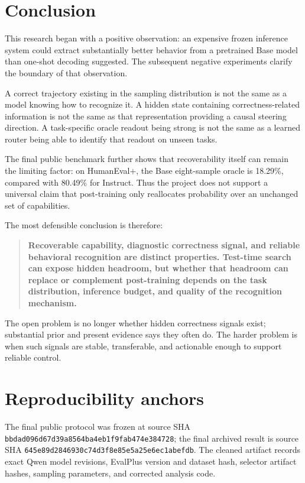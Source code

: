 \documentclass[11pt]{article}
\begin{document}
\section{Conclusion}

This research began with a positive observation: an expensive frozen inference system could extract substantially better behavior from a pretrained Base model than one-shot decoding suggested. The subsequent negative experiments clarify the boundary of that observation.

A correct trajectory existing in the sampling distribution is not the same as a model knowing how to recognize it. A hidden state containing correctness-related information is not the same as that representation providing a causal steering direction. A task-specific oracle readout being strong is not the same as a learned router being able to identify that readout on unseen tasks.

The final public benchmark further shows that recoverability itself can remain the limiting factor: on HumanEval+, the Base eight-sample oracle is 18.29\%, compared with 80.49\% for Instruct. Thus the project does not support a universal claim that post-training only reallocates probability over an unchanged set of capabilities.

The most defensible conclusion is therefore:

\begin{quote}
\textbf{Recoverable capability, diagnostic correctness signal, and reliable behavioral recognition are distinct properties. Test-time search can expose hidden headroom, but whether that headroom can replace or complement post-training depends on the task distribution, inference budget, and quality of the recognition mechanism.}
\end{quote}

The open problem is no longer whether hidden correctness signals exist; substantial prior and present evidence says they often do. The harder problem is when such signals are stable, transferable, and actionable enough to support reliable control.




\appendix

\section{Reproducibility anchors}

The final public protocol was frozen at source SHA
\texttt{bbdad096d67d39a8564ba4eb1f9fab474e384728}; the final archived result is source SHA
\texttt{645e89d2846930c74d3f8e85e5a25e6ec1abefdb}. The cleaned artifact records exact Qwen model revisions, EvalPlus version and dataset hash, selector artifact hashes, sampling parameters, and corrected analysis code.
\end{document}
